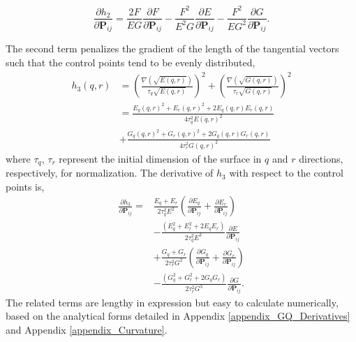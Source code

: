 \documentclass[journal]{IEEEtran}
\theoremstyle{definition}
\begin{document}
\begin{equation}\label{angle_deri}
  \frac{\partial h_2}{\partial {\mathbf{P}}_{ij}} = \frac{2F}{EG}\frac{\partial F}{\partial {\mathbf{P}}_{ij}} - \frac{F^2}{E^2G}\frac{\partial E}{\partial {\mathbf{P}}_{ij}} - \frac{F^2}{EG^2}\frac{\partial G}{\partial {\mathbf{P}}_{ij}}.
\end{equation}

The second term penalizes the gradient of the length of the tangential vectors such that the control points tend to be evenly distributed,
\begin{equation} \label{Constraint_curvature3}
  \begin{split}
    h_3(q,r) &=  \left(\frac{\nabla(\sqrt{E(q,r)})}{\tau_q\sqrt{E(q,r)}}\right)^2 + \left(\frac{\nabla(\sqrt{G(q,r)})}{\tau_r\sqrt{G(q,r)}}\right)^2 \\
    &= \frac{E_q(q,r)^2 + E_r(q,r)^2 + 2E_q(q,r)E_r(q,r)}{4\tau_q^2E(q,r)^2} \\
    &+ \frac{G_q(q,r)^2 + G_r(q,r)^2 + 2G_q(q,r)G_r(q,r)}{4\tau_r^2G(q,r)^2}
  \end{split}
\end{equation}
where ${\tau_q}$, ${\tau_r}$ represent the initial dimension of the surface in $q$ and $r$ directions, respectively, for normalization. The derivative of $h_3$ with respect to the control points is,
\begin{equation}\label{tanLen_deri}
  \begin{split}
    \frac{\partial h_3}{\partial {\mathbf{P}}_{ij}} = &\frac{E_q+E_r}{2\tau_q^2E^2}\left(\frac{\partial E_q}{\partial {\mathbf{P}}_{ij}} + \frac{\partial E_r}{\partial {\mathbf{P}}_{ij}}\right) \\
    &- \frac{(E_q^2 + E_r^2 + 2E_qE_r)}{2\tau_q^2E^3}\frac{\partial E}{\partial {\mathbf{P}}_{ij}} \\
    &+ \frac{G_q+G_r}{2\tau_r^2G^2}\left(\frac{\partial G_q}{\partial {\mathbf{P}}_{ij}} + \frac{\partial G_r}{\partial {\mathbf{P}}_{ij}}\right) \\
    &- \frac{(G_q^2 + G_r^2 + 2G_qG_r)}{2\tau_r^2G^3}\frac{\partial G}{\partial {\mathbf{P}}_{ij}}.
  \end{split}
\end{equation}
The related terms are lengthy in expression but easy to calculate numerically, based on the analytical forms detailed in Appendix \ref{appendix_GQ_Derivatives} and Appendix \ref{appendix_Curvature}.

\end{document}
